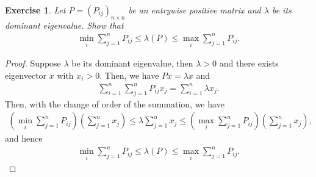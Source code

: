 \documentclass[10pt]{book}
\newtheorem{exercise}{Exercise}[section]
\theoremstyle{definition}
\numberwithin{equation}{chapter}
\begin{document}
\medskip

\begin{exercise}
Let $P = \left(P_{ij}\right)_{n\times n}$ be an entrywise positive matrix and $\lambda$ be its dominant eigenvalue. Show that 
\begin{align*}
    \min_{i} \sum^n_{j=1} P_{ij} \leq \lambda(P) \leq \max_{i} \sum^n_{j=1} P_{ij}.
\end{align*}
\end{exercise}
\begin{proof}
Suppose $\lambda$ be its dominant eigenvalue, then $\lambda > 0$ and there exists eigenvector $x$ with $x_i > 0$. Then, we have $Px = \lambda x$ and 
\begin{align*}
    \sum^n_{i=1}\sum^n_{j=1} P_{ij} x_j = \sum^n_{i=1} \lambda x_j.
\end{align*}
Then, with the change of order of the summation, we have 
\begin{align*}
    \left(\min_{i} \sum^n_{j=1} P_{ij} \right) \left(\sum^n_{j=1}x_j\right) \leq \lambda \sum^n_{j=1}x_j \leq \left(\max_{i} \sum^n_{j=1} P_{ij} \right) \left(\sum^n_{j=1}x_j\right),
\end{align*}
and hence
\begin{align*}
    \min_{i} \sum^n_{j=1} P_{ij} \leq \lambda(P) \leq \max_{i} \sum^n_{j=1} P_{ij}.
\end{align*}
\end{proof}

\medskip
\end{document}
